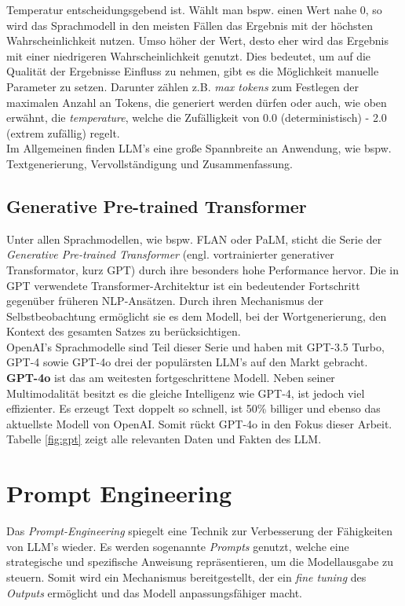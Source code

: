 Temperatur entscheidungsgebend ist. Wählt man bspw. einen Wert nahe 0, so wird das Sprachmodell in den meisten Fällen das Ergebnis mit der höchsten Wahrscheinlichkeit nutzen. Umso höher der Wert, desto eher wird das Ergebnis mit einer niedrigeren Wahrscheinlichkeit genutzt. \cite*{WeightsBiases} Dies bedeutet, um auf die Qualität der Ergebnisse Einfluss zu nehmen, gibt es die Möglichkeit manuelle Parameter zu setzen. Darunter zählen z.B. \textit{max tokens} zum Festlegen der maximalen Anzahl an Tokens, die generiert werden dürfen oder auch, wie oben erwähnt, die \textit{temperature}, welche die Zufälligkeit von 0.0 (deterministisch) - 2.0 (extrem zufällig) regelt.\\ Im Allgemeinen finden LLM's eine große Spannbreite an Anwendung, wie bspw. Textgenerierung, Vervollständigung und Zusammenfassung. \cite*{dhadukHowLargeLanguage2023}

\subsection{Generative Pre-trained Transformer}\label{subsection:gpt}
Unter allen Sprachmodellen, wie bspw. FLAN oder PaLM, sticht die Serie der \textit{Generative Pre-trained Transformer} (engl. vortrainierter generativer Transformator, kurz GPT) durch ihre besonders hohe Performance hervor. \cite*{yeComprehensiveCapabilityAnalysis2023} Die in GPT verwendete Transformer-Architektur ist ein bedeutender Fortschritt gegenüber früheren \acs{NLP}-Ansätzen. Durch ihren Mechanismus der Selbstbeobachtung ermöglicht sie es dem Modell, bei der Wortgenerierung, den Kontext des gesamten Satzes zu berücksichtigen. \cite*{yenduriGenerativePretrainedTransformer2023} \\ OpenAI's Sprachmodelle sind Teil dieser Serie und haben mit GPT-3.5 Turbo, GPT-4 sowie GPT-4o drei der populärsten LLM's auf den Markt gebracht. \cite*{yaoSurveyLargeLanguage2024}\\
\textbf{GPT-4o} ist das am weitesten fortgeschrittene Modell. Neben seiner Multimodalität besitzt es die gleiche Intelligenz wie GPT-4, ist jedoch viel effizienter. Es erzeugt Text doppelt so schnell, ist 50\% billiger und ebenso das aktuellste Modell von OpenAI. Somit rückt GPT-4o in den Fokus dieser Arbeit. \cite*{OpenAIPlatform} Tabelle \ref{fig:gpt} zeigt alle relevanten Daten und Fakten des LLM.



\section{Prompt Engineering}
Das \textit{Prompt-Engineering} spiegelt eine Technik zur Verbesserung der Fähigkeiten von LLM's wieder. Es werden sogenannte \textit{Prompts} genutzt, welche eine strategische und spezifische Anweisung repräsentieren, um die Modellausgabe zu steuern. Somit wird ein Mechanismus bereitgestellt, der ein \textit{fine tuning} des \textit{Outputs} ermöglicht und das Modell anpassungsfähiger macht. \cite*{sahooSystematicSurveyPrompt2024} 

